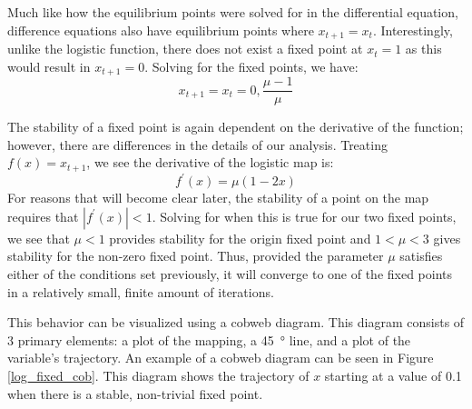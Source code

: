 Much like how the equilibrium points were solved for in the differential equation, difference equations also have equilibrium points where $x_{t+1}=x_t$. Interestingly, unlike the logistic function, there does not exist a fixed point at $x_t=1$ as this would result in $x_{t+1}=0$. Solving for the fixed points, we have:
\begin{equation}
    x_{t+1}=x_t=0,\frac{\mu-1}{\mu}
\end{equation}

The stability of a fixed point is again dependent on the derivative of the function; however, there are differences in the details of our analysis. Treating $f(x)=x_{t+1}$, we see the derivative of the logistic map is:
\begin{equation}
    f^\prime(x)=\mu(1-2x)
\end{equation}
For reasons that will become clear later, the stability of a point on the map requires that $|f^\prime(x)|<1$. Solving for when this is true for our two fixed points, we see that $\mu<1$ provides stability for the origin fixed point and $1<\mu<3$ gives stability for the non-zero fixed point. Thus, provided the parameter $\mu$ satisfies either of the conditions set previously, it will converge to one of the fixed points in a relatively small, finite amount of iterations. 

This behavior can be visualized using a cobweb diagram. This diagram consists of 3 primary elements: a plot of the mapping, a \SI{45}{\degree} line, and a plot of the variable's trajectory. An example of a cobweb diagram can be seen in Figure \ref{log_fixed_cob}. This diagram shows the trajectory of $x$ starting at a value of 0.1 when there is a stable, non-trivial fixed point.

